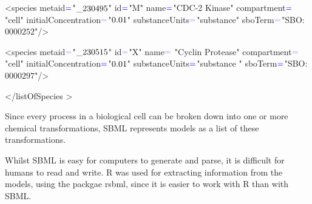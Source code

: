\documentclass[portrait,a1paper,fontscale=0.5]{baposter}
\begin{document}
\begin{poster}
{\begin{flushleft}
{{ <\color{red}species metaid$\color{blue}=$\color{blue}"$\color{black}\_230495$\color{blue}" \color{red} id$\color{blue}=$\color{blue}"\color{black}M\color{blue}" \color{red} name$\color{blue}=$\color{blue}"\color{black}CDC-2 Kinase\color{blue}" \color{red} compartment$\color{blue}=$\color{blue}"\color{black}cell\color{blue}" \color{red} initialConcentration$\color{blue}=$\color{blue}"$\color{black}0.01$\color{blue}" \color{red} substanceUnits$\color{blue}=$\color{blue}"\color{black}substance\color{blue}" \color{red} sboTerm$\color{blue}=$\color{blue}"\color{black}SBO:$0000252$\color{blue}"/>
 
 <\color{red}species metaid$\color{blue}=$\color{blue}"$\color{black}\_230515$\color{blue}" \color{red} id$\color{blue}=$\color{blue}"\color{black}X\color{blue}" \color{red} name$ \color{blue}=$ \color{blue} "\color{black}Cyclin Protease\color{blue}" \color{red} compartment$\color{blue}=$\color{blue}"\color{black}cell\color{blue}" \color{red} initialConcentration$\color{blue}=$\color{blue}"$\color{black} 0.01$\color{blue}" \color{red} substanceUnits$\color{blue}=$\color{blue}"\color{black}substance \color{blue}" \color{red} sboTerm$\color{blue}=$\color{blue}"\color{black}SBO:$0000297$\color{blue}"/>
 
 <\color{red}/listOfSpecies \color{blue}>}}
 \end{flushleft}
 
 Since every process in a biological cell can be broken down into one or more chemical transformations, SBML represents models as a list of these transformations. 
 
 Whilst SBML is easy for computers to generate and parse, it is difficult for humans to read and write. R was used for extracting information from the models, using the packgae rsbml, since it is easier to work with R than with SBML.
 }
 
\end{poster}
\end{document}
